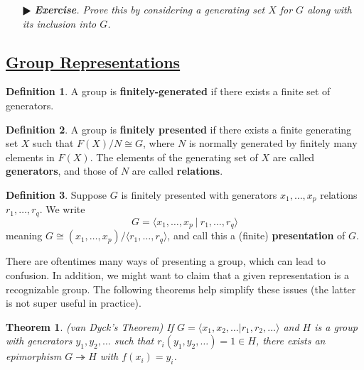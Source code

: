\documentclass[11pt]{amsart}
\newtheorem*{theorem*}{Theorem}
\theoremstyle{definition}
\newtheorem*{definition*}{Definition}
\renewcommand\:{\colon}
\newcommand{\1}{\mathds{1}}
\newcommand{\exc}[1]{\vspace{-2.5pt}\begin{itemize}[leftmargin=15pt]\item[$\RHD$] \textit{\textbf{Exercise}. #1}\end{itemize}}
\begin{document}
\exc{Prove this by considering a generating set $X$ for $G$ along with its inclusion into $G$.}

\vskip20pt



\subsection*{\underline{Group Representations}}

\begin{definition*}
	A group is \textbf{finitely-generated} if there exists a finite set of generators.
\end{definition*}

\begin{definition*}
	A group is \textbf{finitely presented} if there exists a finite generating set $X$ such that $F(X)/N \cong G$, where $N$ is normally generated by finitely many elements in $F(X)$. The elements of the generating set of $X$ are called \textbf{generators}, and those of $N$ are called \textbf{relations}.
\end{definition*}

\begin{definition*}
	Suppose $G$ is finitely presented with generators $x_1, \dots, x_p$ relations $r_1, \dots, r_q$. We write
		\[ G = \langle x_1, \dots, x_p \ | \ r_1, \dots, r_q \rangle \]
	 meaning $G \cong (x_1, \dots, x_p) / \langle r_1, \dots, r_q \rangle$, and call this a (finite) \textbf{presentation} of $G$.
\end{definition*}

There are oftentimes many ways of presenting a group, which can lead to confusion. In addition, we might want to claim that a given representation is a recognizable group. The following theorems help simplify these issues (the latter is not super useful in practice).

\begin{theorem*}
	\textnormal{(van Dyck's Theorem)} If $G = \langle x_1, x_2, \dots | r_1, r_2, \dots \rangle$ and $H$ is a group with generators $y_1, y_2, \dots$ such that $r_i(y_1, y_2, \dots) = 1 \in H$, there exists an epimorphism $G \twoheadrightarrow H$ with $f(x_i) = y_i$. 
\end{theorem*}

\begin{center}
\end{center}
\end{document}
